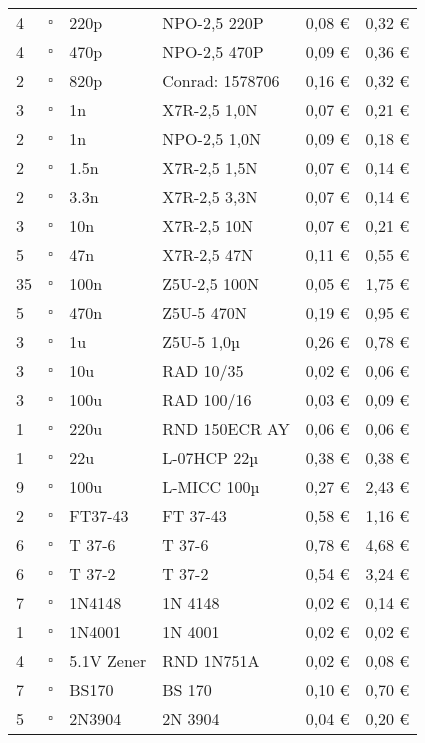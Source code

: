 \begin{longtable}{|p{}|p{}|p{}|p{}|p{}|p{}|}
4 & $\square$ & 220p & NPO-2,5 220P & 0,08 \euro & 0,32 \euro \\
4 & $\square$ & 470p & NPO-2,5 470P & 0,09 \euro & 0,36 \euro \\
2 & $\square$ & 820p & Conrad: 1578706 & 0,16 \euro & 0,32 \euro \\
3 & $\square$ & 1n & X7R-2,5 1,0N & 0,07 \euro & 0,21 \euro \\
2 & $\square$ & 1n & NPO-2,5 1,0N & 0,09 \euro & 0,18 \euro \\
2 & $\square$ & 1.5n & X7R-2,5 1,5N & 0,07 \euro & 0,14 \euro \\
2 & $\square$ & 3.3n & X7R-2,5 3,3N & 0,07 \euro & 0,14 \euro \\
3 & $\square$ & 10n & X7R-2,5 10N & 0,07 \euro & 0,21 \euro \\
5 & $\square$ & 47n & X7R-2,5 47N & 0,11 \euro & 0,55 \euro \\
35 & $\square$ & 100n & Z5U-2,5 100N & 0,05 \euro & 1,75 \euro \\
5 & $\square$ & 470n & Z5U-5 470N & 0,19 \euro & 0,95 \euro \\
3 & $\square$ & 1u & Z5U-5 1,0µ & 0,26 \euro & 0,78 \euro \\ \hline		
3 & $\square$ & 10u & RAD 10/35 & 0,02 \euro & 0,06 \euro \\
3 & $\square$ & 100u & RAD 100/16 & 0,03 \euro & 0,09 \euro \\
1 & $\square$ & 220u & RND 150ECR AY & 0,06 \euro & 0,06 \euro \\ \hline
1 & $\square$ & 22u & L-07HCP 22µ & 0,38 \euro & 0,38 \euro \\
9 & $\square$ & 100u & L-MICC 100µ & 0,27 \euro & 2,43 \euro \\ \hline
2 & $\square$ & FT37-43 & FT 37-43 & 0,58 \euro & 1,16 \euro \\
6 & $\square$ & T 37-6 & T 37-6 & 0,78 \euro & 4,68 \euro \\
6 & $\square$ & T 37-2 & T 37-2 & 0,54 \euro & 3,24 \euro \\ \hline
7 & $\square$ & 1N4148 & 1N 4148 & 0,02 \euro & 0,14 \euro \\
1 & $\square$ & 1N4001 & 1N 4001 & 0,02 \euro & 0,02 \euro \\
4 & $\square$ & 5.1V Zener & RND 1N751A &0,02 \euro & 0,08 \euro \\
7 & $\square$ & BS170 & BS 170 & 0,10 \euro & 0,70 \euro \\
5 & $\square$ & 2N3904 & 2N 3904 & 0,04 \euro & 0,20 \euro \\

\end{longtable}
